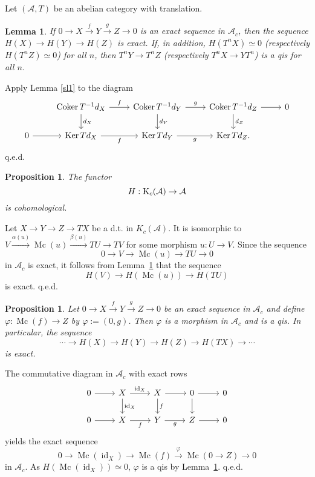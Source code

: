 \documentclass[12pt]{article}
\newtheorem{lem}[thm]{Lemma}
\newtheorem{prop}[thm]{Proposition}
\theoremstyle{remark}%
\newcommand{\n}{\noindent}
\newcommand{\A}{\mathcal A}
\newcommand{\p}{\varphi}
\newcommand{\xr}{\xrightarrow}
\DeclareMathOperator{\Coker}{Coker}
\DeclareMathOperator{\id}{id}
\DeclareMathOperator{\Ker}{Ker}
\DeclareMathOperator{\Mc}{Mc}
\begin{document}
Let $(\A,T)$ be an abelian category with translation. 
%
\begin{lem}\label{sl2}
If $0\to X\xr fY\xr g Z\to0$ is an exact sequence in $\A_c$, then the sequence $H(X)\to H(Y)\to H(Z)$ is exact. If, in addition, $H(T^nX)\simeq0$ (respectively  $H(T^nZ)\simeq0$) for all $n$, then $T^nY\to T^nZ$ (respectively  $T^nX\to YT^n$) is a qis for all $n$. 
\end{lem}
% 
\n{\em Proof.} Apply Lemma \ref{sl1} to the diagram 
$$
\begin{tikzcd}
{}&\Coker T^{-1}d_X\ar{d}{d_X}\ar{r}{f}&\Coker T^{-1}d_Y\ar{d}{d_Y}\ar{r}{g}&\Coker T^{-1}d_Z\ar{d}{d_Z}\ar{r}&0\\ 
0\ar{r}&\Ker Td_X\ar{r}[swap]{f}&\Ker Td_Y\ar{r}[swap]{g}&\Ker Td_Z.
\end{tikzcd}
$$ 
q.e.d. 
%
\begin{prop}\label{sl3}
The functor 
$$
H:\text K_c(\A)\to\A
$$ 
is cohomological. 
\end{prop}
%
\n{\em Proof.} Let $X\to Y\to Z\to TX$ be a d.t. in $K_c(\A)$. It is isomorphic to $V\xr{\alpha(u)}\Mc(u)\xr{\beta(u)}TU\to TV$ for some morphism $u:U\to V$. Since the sequence  
$$
0\to V\to\Mc(u)\to TU\to0
$$ 
in $\A_c$ is exact, it follows from Lemma~\ref{sl2} that the sequence 
$$ 
H(V)\to H(\Mc(u))\to H(TU)
$$ 
is exact. q.e.d.
%
\begin{prop}\label{sl4}
Let $0\to X\xr f Y\xr g Z\to0$ be an exact sequence in $\A_c$ and define $\p:\Mc(f)\to Z$ by $\p:=(0,g)$. Then $\p$ is a morphism in $\A_c$ and is a qis. In particular, the sequence 
$$
\cdots\to H(X)\to H(Y)\to H(Z)\to H(TX)\to\cdots
$$
is exact.
\end{prop}
%
\n{\em Proof.} The commutative diagram in $\A_c$ with exact rows 
$$
\begin{tikzcd}
0\ar{r}&X\ar{d}{\id_X}\ar{r}{\id_X}&X\ar{d}{f}\ar{r}&0\ar{d}\ar{r}&0\\ 
0\ar{r}&X\ar{r}[swap]{f}&Y\ar{r}[swap]{g}&Z\ar{r}&0
\end{tikzcd}
$$ 
yields the exact sequence 
$$
0\to\Mc(\id_X)\to\Mc(f)\xr\p\Mc(0\to Z)\to0
$$
in $\A_c$. As $H(\Mc(\id_X))\simeq0$, $\p$ is a qis by Lemma~\ref{sl2}. q.e.d.
%
\end{document}
